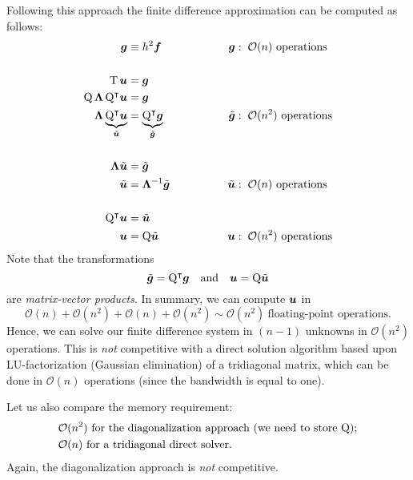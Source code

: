Following this approach the finite difference approximation can be computed as
follows:
\begin{alignat*}{2}
  \boldsymbol g &\equiv  h^2 {\boldsymbol f} \quad &  \qquad \qquad \boldsymbol g
  &: \; \mathcal{O}(n) ~ \text{operations} \\
  \\
  {\mathrm T} \, {{\boldsymbol u}} &= \boldsymbol g \\
  {\mathrm Q} \, \boldsymbol \Lambda \, {\mathrm Q}^\intercal {{\boldsymbol u}} &= \boldsymbol g \\
  \boldsymbol \Lambda \underbrace{{\mathrm Q}^\intercal {{\boldsymbol u}}}_{\tilde{{{\boldsymbol u}}}}
  &= \underbrace{{\mathrm Q}^\intercal \boldsymbol g}_{\tilde{\boldsymbol g}}
  & \tilde{\boldsymbol g} &: \; \mathcal{O}(n^2) ~ \text{operations} \\
  \\
  \boldsymbol \Lambda \tilde{{{\boldsymbol u}}} &= \tilde{\boldsymbol g} \\
  \tilde{{{\boldsymbol u}}} &= \boldsymbol \Lambda^{-1} \tilde{\boldsymbol g}
  & \tilde{{{\boldsymbol u}}} &: \; \mathcal{O}(n) ~ \text{operations} \\
  \\
  {\mathrm Q}^\intercal {{\boldsymbol u}} &= \tilde{{{\boldsymbol u}}} \\
  {{\boldsymbol u}} &= {\mathrm Q} \tilde{{{\boldsymbol u}}} & {{\boldsymbol u}}
  &: \; \mathcal{O}(n^2) ~ \text{operations}
\end{alignat*}
Note that the transformations
\begin{equation*}
  \tilde{\boldsymbol g} = {\mathrm Q}^\intercal \boldsymbol g \quad \text{and} \quad {{\boldsymbol u}} = {\mathrm Q} \tilde{{{\boldsymbol u}}}
\end{equation*}
are \emph{matrix-vector products}. In summary, we can compute ${{\boldsymbol u}}$ in
\begin{equation*}
  \mathcal{O}(n) + \mathcal{O}(n^2) + \mathcal{O}(n) + \mathcal{O}(n^2)
  \sim \mathcal{O}(n^2) ~ \text{floating-point operations}.
\end{equation*}
Hence, we can solve our finite difference system in $(n-1)$ unknowns in
$\mathcal{O}(n^2)$ operations. This is \emph{not} competitive with a direct
solution algorithm based upon LU-factorization (Gaussian elimination) of a
tridiagonal matrix, which can be done in $\mathcal{O}(n)$ operations (since the
bandwidth is equal to one).

Let us also compare the memory requirement:
\begin{align*}
  &\mathcal{O}(n^2) ~\text{for the diagonalization approach
  (we need to store ${\mathrm Q}$)}; \\
  &\mathcal{O}(n) ~\text{for a tridiagonal direct solver}.
\end{align*}
Again, the diagonalization approach is {\em not} competitive.

